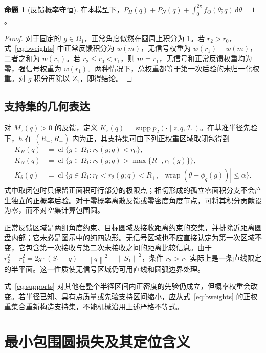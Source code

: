 \documentclass[UTF8,a4paper,zihao=-4,fontset=none]{ctexart}
\numberwithin{equation}{section}
\theoremstyle{definition}
\newtheorem{proposition}{命题}[section]
\newcommand{\dd}{\,\mathrm d}
\newcommand{\norm}[1]{\left\lVert #1\right\rVert}
\newcommand{\wrap}{\operatorname{wrap}}
\newcommand{\supp}{\operatorname{supp}}
\newcommand{\cl}{\operatorname{cl}}
\begin{document}
\begin{proposition}[反馈概率守恒]\label{prop:normalization}
在本模型下，\(P_H(q)+P_N(q)+\int_0^{2\pi}f_\Theta(\theta;q)\dd\theta=1\)。
\end{proposition}
\begin{proof}
对于固定的 \(g\in\Omega_1\)，正常角度似然在圆周上积分为 1。若 \(r_2>r_0\)，式~\eqref{eq:bweights} 中正常反馈积分为 \(w(m)\)，无信号权重为 \(w(r_1)-w(m)\)，二者之和为 \(w(r_1)\)。若 \(r_2\le r_0<r_1\)，则 \(m=r_1\)，无信号和正常反馈权重均为零，强信号权重为 \(w(r_1)\)。两种情况下，总权重都等于第一次后验的未归一化权重。对 \(g\) 积分再除以 \(Z_1\)，即得结论。
\end{proof}

\subsection{支持集的几何表达}
对 \(M_z(q)>0\) 的反馈，定义 \(K_z(q)=\supp p_2(\cdot\mid z,q,\mathcal I_1)\)。在基准半径先验下，\(h\) 在 \((R_-,R_+)\) 内为正，其支持集可由下列正权重区域取闭包得到
\begin{equation}\label{eq:supports}
\begin{aligned}
K_H(q)&=\cl\{g\in\Omega_1:r_2(g;q)<r_0\},\\
K_N(q)&=\cl\{g\in\Omega_1:r_2(g;q)>\max\{R_-,r_1(g)\}\},\\
K_\theta(q)&=\cl\{g\in\Omega_1:r_0<r_2(g;q)<R_+,\
|\wrap(\theta-\phi_q(g))|\le\alpha\}.
\end{aligned}
\end{equation}
式中取闭包时只保留正面积可行部分的极限点；相切形成的孤立零面积分支不会产生独立的正概率后验。对于零概率离散反馈或零密度角度节点，可将其积分贡献设为零，而不对空集计算包围圆。

正常反馈区域是两组角度约束、目标圆域及接收距离约束的交集，并排除近距离圆盘内部；它未必是图示中的纯四边形。无信号区域也不应直接认定为第一次区域不变，它包含第一次接收与第二次未接收之间的距离比较信息。由于 \(r_2^2-r_1^2=2g\cdot(S_1-q)+\norm{q}^2-\norm{S_1}^2\)，条件 \(r_2>r_1\) 实际上是一条直线限定的半平面。这一性质使无信号区域仍可用直线和圆弧边界处理。

式~\eqref{eq:supports} 对其他在整个半径区间内正密度的先验仍成立，但概率权重会改变。若半径已知、具有点质量或先验支持区间缩小，应从式~\eqref{eq:bweights} 的正权重集合重新构造支持集，不能机械沿用上述严格不等式。

\section{最小包围圆损失及其定位含义}
\end{document}
